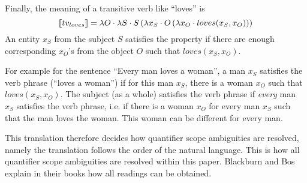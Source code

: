 Finally, the meaning of a transitive verb like ``loves'' is $$\llbracket tv_{loves} \rrbracket = \lambda O \cdot \lambda S \cdot S \left( \lambda x_S \cdot O \left( \lambda x_O \cdot loves(x_S, x_O) \right) \right)$$ An entity $x_S$ from the subject $S$ satisfies the property if there are enough corresponding $x_O$'s from the object $O$ such that $loves(x_S, x_O)$.

For example for the sentence ``Every man loves a woman'', a man $x_S$ satisfies the verb phrase (``loves a woman'') if for this man $x_S$, there is a woman $x_O$ such that $loves(x_S, x_O)$. The subject (as a whole) satisfies the verb phrase if \textit{every} man $x_S$ satisfies the verb phrase, i.e. if there is a woman $x_O$ for every man $x_S$ such that the man loves the woman. This woman can be different for every man.

This translation therefore decides how quantifier scope ambiguities are resolved, namely the translation follows the order of the natural language. This is how all quantifier scope ambiguities are resolved within this paper. Blackburn and Bos explain in their books how all readings can be obtained.

